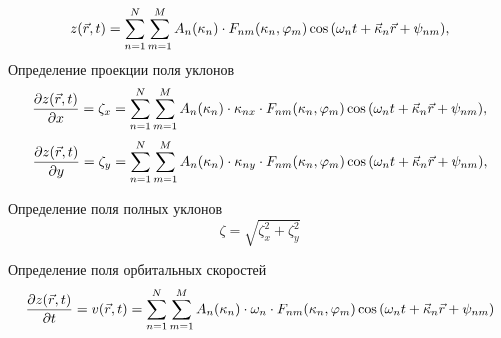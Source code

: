 \documentclass[10pt,pdf,hyperref={unicode}, dvipsnames]{beamer}
\renewcommand{\phi}{\varphi}
\begin{document}
\begin{frame}[t]{}
    \begin{equation}
        z(\vec r,t) = \sum\limits_{n=1}^{N} \sum\limits_{m=1}^{M}
        A_n(\kappa_n) \cdot
        F_{nm}(\kappa_n,\phi_m) \cos \qty(\omega_n t + \vec \kappa_n \vec r + \psi_{nm}),
    \end{equation}
    Определение проекции поля уклонов 
    \begin{equation}
        \pdv{z(\vec r,t)}{x} = \zeta_x = \sum\limits_{n=1}^{N} \sum\limits_{m=1}^{M}
        A_n(\kappa_n) \cdot \kappa_{nx} \cdot
        F_{nm}(\kappa_n,\phi_m) \cos \qty(\omega_n t + \vec \kappa_n \vec r + \psi_{nm}),
    \end{equation}
    \begin{equation}
        \pdv{z(\vec r,t)}{y} = \zeta_y = \sum\limits_{n=1}^{N} \sum\limits_{m=1}^{M}
        A_n(\kappa_n) \cdot \kappa_{ny} \cdot
        F_{nm}(\kappa_n,\phi_m) \cos \qty(\omega_n t + \vec \kappa_n \vec r + \psi_{nm}),
    \end{equation}

    Определение поля полных уклонов
    \begin{equation}
        \zeta = \sqrt{\zeta_x^2 + \zeta_y^2}
    \end{equation}

    Определение поля орбитальных скоростей
    \begin{equation}
         \pdv{z(\vec r,t)}{t} = v(\vec r, t) = \sum\limits_{n=1}^{N} \sum\limits_{m=1}^{M}
        A_n(\kappa_n) \cdot \omega_{n} \cdot
        F_{nm}(\kappa_n,\phi_m) \cos \qty(\omega_n t + \vec \kappa_n \vec r + \psi_{nm})
    \end{equation}
\end{frame}
\end{document}
